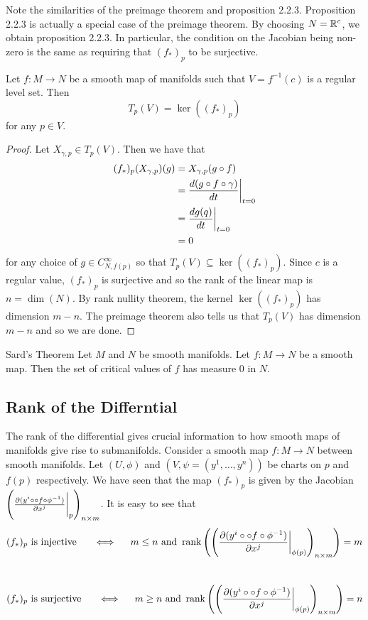 \documentclass[a4paper]{article}
\begin{document}
Note the similarities of the preimage theorem and proposition 2.2.3. Proposition 2.2.3 is actually a special case of the preimage theorem. By choosing $N=\mathbb{R}^c$, we obtain proposition 2.2.3. In particular, the condition on the Jacobian being non-zero is the same as requiring that $(f_\ast)_p$ to be surjective. 

\begin{prp}{}{} Let $f:M\to N$ be a smooth map of manifolds such that $V=f^{-1}(c)$ is a regular level set. Then $$T_p(V)=\ker((f_\ast)_p)$$ for any $p\in V$. \tcbline
\begin{proof}
Let $X_{\gamma,p}\in T_p(V)$. Then we have that 
\begin{align*}
(f_\ast)_p(X_{\gamma,p})(g)&=X_{\gamma,p}(g\circ f)\\
&=\frac{d(g\circ f\circ\gamma)}{dt}\bigg{|}_{t=0}\\
&=\frac{dg(q)}{dt}\bigg{|}_{t=0}\\
&=0
\end{align*}
for any choice of $g\in C_{N,f(p)}^\infty$ so that $T_p(V)\subseteq\ker((f_\ast)_p)$. Since $c$ is a regular value, $(f_\ast)_p$ is surjective and so the rank of the linear map is $n=\dim(N)$. By rank nullity theorem, the kernel $\ker((f_\ast)_p)$ has dimension $m-n$. The preimage theorem also tells us that $T_p(V)$ has dimension $m-n$ and so we are done. 
\end{proof}
\end{prp}

\begin{thm}{Sard's Theorem}{} Let $M$ and $N$ be smooth manifolds. Let $f:M\to N$ be a smooth map. Then the set of critical values of $f$ has measure $0$ in $N$. 
\end{thm}

\subsection{Rank of the Differntial}
The rank of the differential gives crucial information to how smooth maps of manifolds give rise to submanifolds. Consider a smooth map $f:M\to N$ between smooth manifolds. Let $(U,\phi)$ and $(V,\psi=(y^1,\dots,y^n))$ be charts on $p$ and $f(p)$ respectively. We have seen that the map $(f_\ast)_p$ is given by the Jacobian $\left(\frac{\partial(y^i\circ\circ f\circ\phi^{-1})}{\partial x^j}\bigg{|}_p\right)_{n\times m}$. It is easy to see that $$(f_\ast)_p\text{ is injective }\;\;\;\;\iff\;\;\;\;m\leq n\text{ and }\rank\left(\left(\frac{\partial(y^i\circ\circ f\circ\phi^{-1})}{\partial x^j}\bigg{|}_{\phi(p)}\right)_{n\times m}\right)=m$$~$$(f_\ast)_p\text{ is surjective }\;\;\;\;\iff\;\;\;\;m\geq n\text{ and }\rank\left(\left(\frac{\partial(y^i\circ\circ f\circ\phi^{-1})}{\partial x^j}\bigg{|}_{\phi(p)}\right)_{n\times m}\right)=n$$ 
\end{document}

